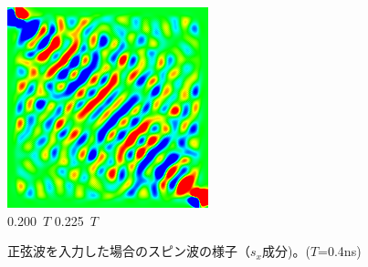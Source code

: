 \documentclass[a4j, twocolumn]{jsarticle}
\begin{document}
\begin{figure}
\includegraphics[width=0.4\hsize]{./figures/capture/sin/sinsqr128_32i_l_dif_5770} \\
0.200\ $T$ \hspace*{0.25\hsize} 0.225\ $T$  \vspace{5pt}\\
\caption{
正弦波を入力した場合のスピン波の様子（$s_{x}$成分)。($T$=0.4ns)
}
\label{fig:waves1xsin}
\end{figure}
\end{document}
